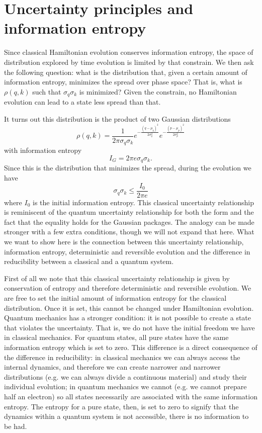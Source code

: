 \documentclass{ws-ijqi}
\begin{document}
\section{Uncertainty principles and information entropy}

Since classical Hamiltonian evolution conserves information entropy, the space of distribution explored by time evolution is limited by that constrain. We then ask the following question: what is the distribution that, given a certain amount of information entropy, minimizes the spread over phase space? That is, what is $\rho(q, k)$ such that $\sigma_q\sigma_k$ is minimized? Given the constrain, no Hamiltonian evolution can lead to a state less spread than that.

It turns out this distribution is the product of two Gaussian distributions
\begin{equation}
\rho(q,k) = \frac{1}{2\pi\sigma_q\sigma_k} e^{- \frac{(q - \mu_q)^2}{2 \sigma_q^2}} e^{- \frac{(p - \mu_p)^2}{2 \sigma_p^2}}
\end{equation}
with information entropy
\begin{equation}
I_G = 2 \pi e \sigma_q \sigma_k.
\end{equation}
Since this is the distribution that minimizes the spread, during the evolution we have
\begin{equation}
\sigma_q \sigma_k \leq \frac{I_0}{2 \pi e}
\end{equation}
where $I_0$ is the initial information entropy. This classical uncertainty relationship is reminiscent of the quantum uncertainty relationship for both the form and the fact that the equality holds for the Gaussian packages. The analogy can be made stronger with a few extra conditions, though we will not expand that here. What we want to show here is the connection between this uncertainty relationship, information entropy, deterministic and reversible evolution and the difference in reducibility between a classical and a quantum system.

First of all we note that this classical uncertainty relationship is given by conservation of entropy and therefore deterministic and reversible evolution. We are free to set the initial amount of information entropy for the classical distribution. Once it is set, this cannot be changed under Hamiltonian evolution. Quantum mechanics has a stronger condition: it is not possible to create a state that violates the uncertainty. That is, we do not have the initial freedom we have in classical mechanics. For quantum states, all pure states have the same information entropy which is set to zero. This difference is a direct consequence of the difference in reducibility: in classical mechanics we can always access the internal dynamics, and therefore we can create narrower and narrower distributions (e.g. we can always divide a continuous material) and study their individual evolution; in quantum mechanics we cannot (e.g. we cannot prepare half an electron) so all states necessarily are associated with the same information entropy. The entropy for a pure state, then, is set to zero to signify that the dynamics within a quantum system is not accessible, there is no information to be had.
\end{document}
